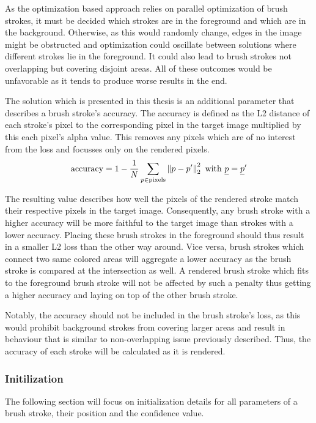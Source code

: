 As the optimization based approach relies on parallel optimization of brush strokes,
it must be decided which strokes are in the foreground and which are in the background.
Otherwise, as this would randomly change, edges in the image might be obstructed
and optimization could oscillate between solutions where different strokes lie in
the foreground.
It could also lead to brush strokes not overlapping but covering disjoint areas.
All of these outcomes would be unfavorable as it tends to produce worse results
in the end.

The solution which is presented in this thesis is an additional parameter that describes
a brush stroke's accuracy.
The accuracy is defined as the L2 distance of each stroke's pixel to the corresponding
pixel in the target image multiplied by this each pixel's alpha value.
This removes any pixels which are of no interest from the loss and focusses only
on the rendered pixels.
\begin{align}
    \text{accuracy} = 1 - \frac{1}{N} \sum_{p \in \text{pixels}} \left\lVert p - p'\right\rVert_2^2 \text{ with } \underline p = \underline p' 
\end{align}

The resulting value describes how well the pixels of the rendered stroke match their
respective pixels in the target image.
Consequently, any brush stroke with a higher accuracy will be more faithful to the
target image than strokes with a lower accuracy.
Placing these brush strokes in the foreground should thus result in a smaller L2 loss
than the other way around.
Vice versa, brush strokes which connect two same colored areas will aggregate a lower
accuracy as the brush stroke is compared at the intersection as well.
A rendered brush stroke which fits to the foreground brush stroke will not be affected by
such a penalty thus getting a higher accuracy and laying on top of the other brush
stroke.

Notably, the accuracy should not be included in the brush stroke's loss, as this
would prohibit background strokes from covering larger areas and result in behaviour
that is similar to non-overlapping issue previously described.
Thus, the accuracy of each stroke will be calculated as it is rendered.


\subsubsection{Initilization}

The following section will focus on initialization details for all parameters of a
brush stroke, their position and the confidence value.

